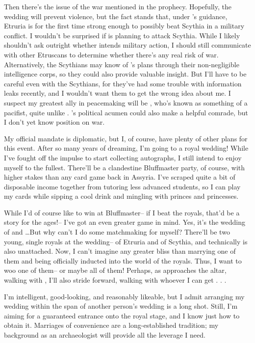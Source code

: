 \documentclass[char]{Kos}
\begin{document}
Then there's the issue of the war mentioned in the prophecy. Hopefully, the wedding will prevent violence, but the fact stands that, under \cEtruriaKing{}'s guidance, Etruria is for the first time strong enough to possibly beat Scythia in a military conflict. I wouldn't be surprised if \cEtruriaKing{} is planning to attack Scythia. While I likely shouldn't ask \cEtruriaKing{\them} outright whether \cEtruriaKing{\they} intends military action, I should still communicate with other Etruscans to determine whether there's any real risk of war. Alternatively, the Scythians may know of \cEtruriaKing{}'s plans through their non-negligible intelligence corps, so they could also provide valuable insight. But I'll have to be careful even with the Scythians, for they've had some trouble with information leaks recently, and I wouldn't want them to get the wrong idea about me. I suspect my greatest ally in peacemaking will be \cGroom{\Prince} \cGroom{}, who's known as something of a pacifist, quite unlike \cGroom{\their} \cEtruriaKing{\parent}. \cBride{}'s political acumen could also make \cBride{\them} a helpful comrade, but I don't yet know \cBride{\their} position on war.

My official mandate is diplomatic, but I, of course, have plenty of other plans for this event. After so many years of dreaming, I'm going to a royal wedding! While I've fought off the impulse to start collecting autographs, I still intend to enjoy myself to the fullest. There'll be a clandestine Bluffmaster party, of course, with higher stakes than any card game back in Assyria. I've scraped quite a bit of disposable income together from tutoring less advanced students, so I can play my cards while sipping a cool drink and mingling with princes and princesses.

While I'd of course like to win at Bluffmaster-- if I beat the royals, that'd be a story for the ages!-- I've got an even greater game in mind. Yes, it's the wedding of \cBride{} and \cGroom{}\ldots But why can't I do some matchmaking for myself? There'll be two young, single royals at the wedding-- \cPoet{} of Etruria and \cWard{} of Scythia, and technically \cEtruriaKing{} is also unattached. Now, I can't imagine any greater bliss than marrying one of them and being officially inducted into the world of the royals. Thus, I want to woo one of them-- or maybe all of them! Perhaps, as \cBride{} approaches the altar, walking with \cGroom{}, I'll also stride forward, walking with whoever I can get . . .

I'm intelligent, good-looking, and reasonably likeable, but I admit arranging my wedding within the span of another person's wedding is a long shot. Still, I'm aiming for a guaranteed entrance onto the royal stage, and I know just how to obtain it. Marriages of convenience are a long-established tradition; my background as an archaeologist will provide all the leverage I need.
\end{document}

